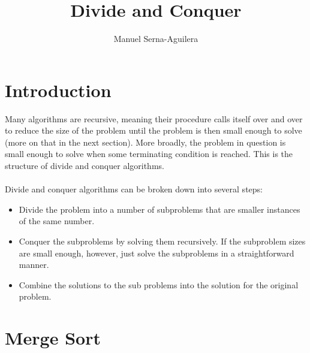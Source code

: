 \documentclass[12pt]{article}
\title{Divide and Conquer}
\author{Manuel Serna-Aguilera}
\date{}
\begin{document}
\maketitle
\section*{Introduction}
Many algorithms are recursive, meaning their procedure calls itself over and over to reduce the size of the problem until the problem is then small enough to solve (more on that in the next section). More broadly, the problem in question is small enough to solve when some terminating condition is reached. This is the structure of divide and conquer algorithms.
\\
\\
Divide and conquer algorithms can be broken down into several steps:
\begin{itemize}
  \item Divide the problem into a number of subproblems that are smaller instances of the same number.
  \item Conquer the subproblems by solving them recursively. If the subproblem sizes are small enough, however, just solve the subproblems in a straightforward manner.
  \item Combine the solutions to the sub problems into the solution for the original problem.
\end{itemize}

\section*{Merge Sort}
\end{document}
